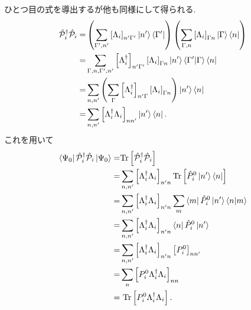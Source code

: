 ひとつ目の式を導出するが他も同様にして得られる.
\begin{equation}
\begin{split}
    \hat{\mathcal{P}}^\dagger_{i}\hat{\mathcal{P}}_{i}=&\left( \sum_{\Gamma', n'}\left[ \Lambda_{i} \right]_{n'\Gamma'}\ket{n'}\bra{\Gamma'} \right)\left( \sum_{\Gamma,n}\left[ \Lambda_{i} \right]_{\Gamma n}\ket{\Gamma}\bra{n} \right)\\
    =&\sum_{\Gamma,n,\Gamma',n'}\left[ \Lambda_{i}^\dagger \right]_{n'\Gamma'}\left[ \Lambda_{i} \right]_{\Gamma n} \ket{n'}\braket{\Gamma'}{\Gamma} \bra{n}\\
    =&\sum_{n,n'}\left( \sum_{\Gamma}\left[ \Lambda^\dagger_{i} \right]_{n'\Gamma}\left[ \Lambda_{i} \right]_{\Gamma n} \right)\ket{n'}\bra{n}\\
    =&\sum_{n,n'}\left[ \Lambda^\dagger_{i}\Lambda_{i} \right]_{nn'}\ket{n'}\bra{n}.
\end{split}
\end{equation}
これを用いて
\begin{equation}
\begin{split}
    \bra{\Psi_{0}}\hat{\mathcal{P}}_{i}^\dagger \hat{\mathcal{P}}_{i}\ket{\Psi_{0}}=&\text{Tr}\left[ \hat{\mathcal{P}}^\dagger_{i}\hat{\mathcal{P}}_{i} \right]\\
    =&\sum_{n,n'}\left[ \Lambda_{i}^\dagger\Lambda_{i} \right]_{n'n}\text{Tr}\left[ \hat{P}_{i}^{0}\ket{n'}\bra{n} \right]\\
    =&\sum_{n,n'}\left[ \Lambda_{i}^\dagger\Lambda_{i} \right]_{n'n}\sum_{m}\bra{m}\hat{P}^{0}_{i}\ket{n'}\bra{n}\ket{m} \\
    =&\sum_{n,n'}\left[ \Lambda_{i}^\dagger\Lambda_{i} \right]_{n'n}\bra{n}\hat{P}^{0}_{i}\ket{n'}\\
    =&\sum_{n,n'}\left[ \Lambda_{i}^\dagger\Lambda_{i} \right]_{n'n}\left[ P^{0}_{i} \right]_{nn'}\\
    =&\sum_{n}\left[ P^{0}_{i}\Lambda_{i}^\dagger\Lambda_{i} \right]_{nn}\\
    =&\ \text{Tr}\left[ P^{0}_{i}\Lambda_{i}^\dagger\Lambda_{i} \right].\\
\end{split}
\end{equation}

